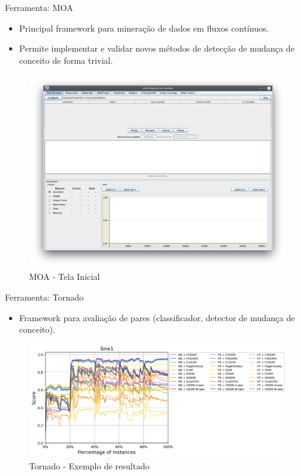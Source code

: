 \documentclass[10pt]{beamer}
\begin{document}
\begin{frame}{Ferramenta: MOA}
    \begin{itemize}
        \item<1 -> Principal framework para mineração de dados em fluxos contínuos.
        \item<1 -> Permite implementar e validar novos métodos de detecção de mudança de conceito de forma trivial.
    \end{itemize}
    \begin{figure}[H]
        \begin{center}
            \includegraphics[scale=0.2]{imagens/moa.png}
            \caption{MOA - Tela Inicial}
            \label{fig:moa}
        \end{center}
    \end{figure}
\end{frame}

\begin{frame}{Ferramenta: Tornado}
    \begin{itemize}
        \item<1 -> Framework para avaliação de pares (classificador, detector de mudança de conceito).
    \end{itemize}
    \begin{figure}[ht]
        \begin{center}
            \includegraphics[width=\textwidth]{imagens/tornado_out2.png}
            \caption{Tornado - Exemplo de resultado \cite{Pesaranghader:Tornado}}
            \label{fig:tornado_out2}
        \end{center}
    \end{figure}
\end{frame}
\end{document}

